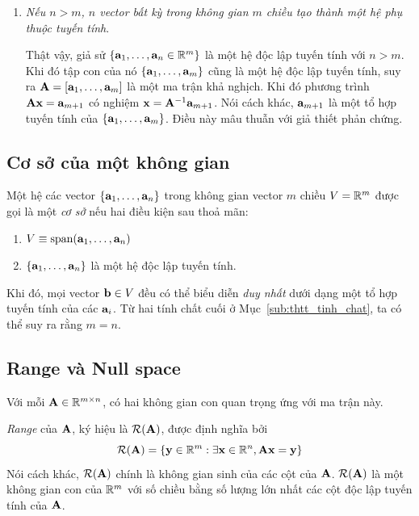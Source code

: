 \begin{enumerate}
\item \textit{Nếu $n > m$, $n$ vector bất kỳ trong không gian $m$
chiều tạo thành một hệ phụ thuộc tuyến tính}.

Thật vậy, giả sử $\{\mathbf{a}_1, \dots, \mathbf{a}_n \in \mathbb{R}^m\} $ là một hệ độc lập tuyến
tính với $n > m$. Khi đó tập con của nó $\{\mathbf{a}_1, \dots, \mathbf{a}_m\}$ cũng là
một hệ độc lập tuyến tính, suy ra $\mathbf{A} = [\mathbf{a}_1, \dots, \mathbf{a}_m]$ là một ma
trận khả nghịch. Khi đó phương trình $\mathbf{A}\mathbf{x} = \mathbf{a}_{m+1}$ có nghiệm $\mathbf{x} =
\mathbf{A}^{-1}\mathbf{a}_{m+1}$. Nói cách khác, $\mathbf{a}_{m+1}$ là một tổ hợp tuyến tính của
$\{\mathbf{a}_1, \dots, \mathbf{a}_m\}$. Điều này mâu thuẫn với giả thiết phản chứng. \dpcm

\end{enumerate}

\subsection{Cơ sở của một không gian} %
\label{sub:co_so_cua_mot_khong_gian}
Một hệ các vector $\{\mathbf{a}_1, \dots, \mathbf{a}_n\}$ trong không gian vector $m$ chiều $V
= \mathbb{R}^m$ được gọi là một \textit{cơ sở} nếu hai điều kiện sau thoả mãn:
\begin{enumerate}
\item $V \equiv \text{span}(\mathbf{a}_1, \dots, \mathbf{a}_n)$
\item $\{\mathbf{a}_1, \dots, \mathbf{a}_n\}$ là một hệ độc lập tuyến tính.
\end{enumerate}

Khi đó, mọi vector $\mathbf{b} \in V$ đều có thể biểu diễn \textit{duy nhất} dưới dạng
một tổ hợp tuyến tính của các $\mathbf{a}_i$. Từ hai tính chất cuối ở Mục~\ref{sub:thtt_tinh_chat}, ta có thể suy ra rằng $m = n$.


\subsection{Range và Null space} %
\label{sub:range_va_null}
Với mỗi $\mathbf{A} \in \mathbb{R}^{m \times n}$, có hai không gian con quan trọng ứng
với ma trận này.

\textit{Range} của $\mathbf{A}$, ký hiệu là $\mathcal{R}(\mathbf{A})$, được định nghĩa bởi
\begin{equation}
\mathcal{R}(\mathbf{A}) = \{\mathbf{y} \in \mathbb{R}^{m} : \exists \mathbf{x} \in \mathbb{R}^{n}, \mathbf{A}\mathbf{x}
=\mathbf{y}\}
\end{equation}
Nói cách khác, $\mathcal{R}(\mathbf{A})$ chính là không gian sinh của các cột của
$\mathbf{A}$. $\mathcal{R}(\mathbf{A})$ là một không gian con của $\mathbb{R}^m$ với số chiều
bằng số lượng lớn nhất các cột độc lập tuyến tính của $\mathbf{A}$.


